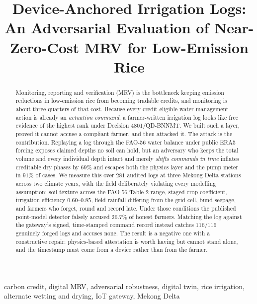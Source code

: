 \title{Device-Anchored Irrigation Logs: An Adversarial Evaluation of
Near-Zero-Cost MRV for Low-Emission Rice}

\begin{abstract}
Monitoring, reporting and verification (MRV) is the bottleneck keeping emission
reductions in low-emission rice from becoming tradable credits, and monitoring is
about three quarters of that cost. Because every credit-eligible water-management
action is already an \emph{actuation command}, a farmer-written irrigation log
looks like free evidence of the highest rank under Decision 4801/QD-BNNMT. We
built such a layer, proved it cannot accuse a compliant farmer, and then attacked
it. The attack is the contribution. Replaying a log through the FAO-56 water
balance under public ERA5 forcing exposes claimed depths no soil can hold, but
an adversary who keeps the total volume and every individual depth intact and
merely \emph{shifts commands in time} inflates creditable dry phases by
$69\%$ and escapes both the physics layer and the pump meter in $91\%$ of cases.
We measure this over $281$ audited logs at three Mekong Delta stations across two
climate years, with the field deliberately violating every modelling assumption:
soil texture across the FAO-56 Table 2 range, staged crop coefficient,
irrigation efficiency $0.60$--$0.85$, field rainfall differing from the grid
cell, bund seepage, and farmers who forget, round and record late. Under those
conditions the published point-model detector falsely accused $26.7\%$ of honest
farmers. Matching the log against the gateway's signed, time-stamped command
record instead catches $116/116$ genuinely forged logs and accuses none. The
result is a negative one with a constructive repair: physics-based attestation is
worth having but cannot stand alone, and the timestamp must come from a device
rather than from the farmer.
\end{abstract}

\begin{IEEEkeywords}
carbon credit, digital MRV, adversarial robustness, digital twin, rice irrigation,
alternate wetting and drying, IoT gateway, Mekong Delta
\end{IEEEkeywords}
